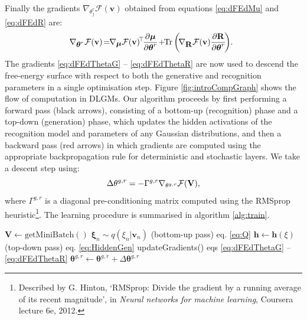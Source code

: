 \documentclass{article}
\newcommand{\FE}{\mathcal{F}} %
\DeclareMathOperator{\Tr}{Tr} %
\newcommand{\model}{DLGM\hspace{1mm}} %
\newcommand{\hid}{\ensuremath{\mathbf{h}}} %
\newcommand{\vis}{\ensuremath{\mathbf{v}}} %
\newcommand{\myvec}[1]{\mbox{$\mathbf{#1}$}}
\newcommand{\myvecsym}[1]{\mbox{$\boldsymbol{#1}$}}
\newcommand{\vmu}{\mbox{$\myvecsym{\mu}$}}
\newcommand{\vtheta}{\mbox{$\myvecsym{\theta}$}}
\newcommand{\vxi}{\mbox{$\myvecsym{\xi}$}}
\newcommand{\vR}{\mbox{$\myvec{R}$}}
\newcommand{\vV}{\mbox{$\myvec{V}$}}
\begin{document}
\begin{bibunit}[icml2013]
Finally the gradients $\nabla_{ \theta_j^r } \FE (\vis)$ obtained from 
equations \eqref{eq:dFEdMu} and \eqref{eq:dFEdR} are:
\vspace{-2mm}
\begin{align}
\!\!\!\nabla_{\small{\vtheta^r}} \FE (\vis) \!=\! 
\! \nabla_{\small{\vmu}} \FE (\vis)\!^\top\! \frac{\partial \vmu}{\partial 
\vtheta^r}\! +\! \! \Tr \left(\!\nabla_{\small{\vR}} \FE(\vis)\frac{\partial 
\vR}{\partial 
\vtheta^r} \!\right) \!. \label{eq:dFEdThetaR}
\end{align}
The gradients \eqref{eq:dFEdThetaG} -- 
\eqref{eq:dFEdThetaR} are now used to descend the free-energy surface with respect to  
both the 
generative and recognition parameters in a single optimisation step. 
Figure \ref{fig:introCompGraph} shows the flow of computation in 
DLGMs. Our algorithm proceeds by first performing a forward pass (black 
arrows), consisting of a bottom-up (recognition) phase and a top-down 
(generation) phase, which updates the hidden activations of the recognition 
model and parameters of any Gaussian distributions, and then a backward 
pass 
(red arrows) in which gradients are computed using the appropriate 
backpropagation rule for deterministic and stochastic layers.
We take a descent step using:
\vspace{-1mm}
\begin{equation} 
\Delta \theta^{g,r} = -\Gamma^{g,r} {\nabla_{\theta^{g,r} } 
\FE(\vV)}, \label{eq:SGD}
\vspace{-1mm}
\end{equation}
where $\Gamma^{g,r}$ is a diagonal pre-conditioning matrix computed using the RMSprop 
heuristic\footnote{Described by G. Hinton, 
	`RMSprop: Divide the gradient by a running average of its recent 
		magnitude', in \textit{Neural networks for machine learning}, 
	Coursera lecture 6e, 2012.}. The learning 
procedure is summarised in algorithm 
\ref{alg:train}.
\vspace{1.5mm}
\begin{algorithm}[tbp]
  \caption{Learning in {\model}\!s}
  \label{alg:train}
\begin{algorithmic}
\STATE $\vV \gets \text{getMiniBatch}()$
\STATE $\vxi_n \sim q(\xi_n | \vis_n)$ (bottom-up pass) eq. \eqref{eq:Q}
\STATE $\hid \leftarrow \hid(\xi)$ (top-down pass) eq. \eqref{eq:HiddenGen}
\STATE updateGradients() eqs \eqref{eq:dFEdThetaG} -- %
\eqref{eq:dFEdThetaR}
\STATE $\vtheta^{g,r} \gets \vtheta^{g,r} + \Delta \vtheta^{g,r}$
\ENDWHILE
\end{algorithmic}
\end{algorithm}


\end{bibunit}
\end{document}
